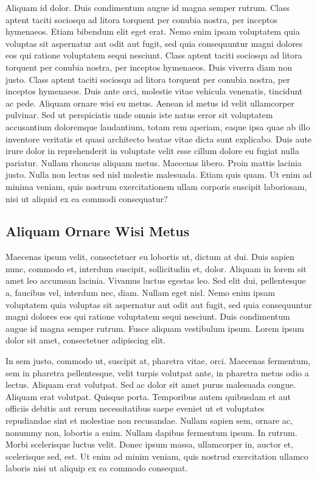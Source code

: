 \documentclass[english,master,dept460,male,cpp,cpdeclaration]{diploma}
\begin{document}
Aliquam id dolor. Duis condimentum augue id magna semper rutrum. Class aptent taciti sociosqu ad litora torquent per conubia nostra, per inceptos hymenaeos. Etiam bibendum elit eget erat. Nemo enim ipsam voluptatem quia voluptas sit aspernatur aut odit aut fugit, sed quia consequuntur magni dolores eos qui ratione voluptatem sequi nesciunt. Class aptent taciti sociosqu ad litora torquent per conubia nostra, per inceptos hymenaeos. Duis viverra diam non justo. Class aptent taciti sociosqu ad litora torquent per conubia nostra, per inceptos hymenaeos. Duis ante orci, molestie vitae vehicula venenatis, tincidunt ac pede. Aliquam ornare wisi eu metus. Aenean id metus id velit ullamcorper pulvinar. Sed ut perspiciatis unde omnis iste natus error sit voluptatem accusantium doloremque laudantium, totam rem aperiam, eaque ipsa quae ab illo inventore veritatis et quasi architecto beatae vitae dicta sunt explicabo. Duis aute irure dolor in reprehenderit in voluptate velit esse cillum dolore eu fugiat nulla pariatur. Nullam rhoncus aliquam metus. Maecenas libero. Proin mattis lacinia justo. Nulla non lectus sed nisl molestie malesuada. Etiam quis quam. Ut enim ad minima veniam, quis nostrum exercitationem ullam corporis suscipit laboriosam, nisi ut aliquid ex ea commodi consequatur?

\subsection{Aliquam Ornare Wisi Metus}
Maecenas ipsum velit, consectetuer eu lobortis ut, dictum at dui. Duis sapien nunc, commodo et, interdum suscipit, sollicitudin et, dolor. Aliquam in lorem sit amet leo accumsan lacinia. Vivamus luctus egestas leo. Sed elit dui, pellentesque a, faucibus vel, interdum nec, diam. Nullam eget nisl. Nemo enim ipsam voluptatem quia voluptas sit aspernatur aut odit aut fugit, sed quia consequuntur magni dolores eos qui ratione voluptatem sequi nesciunt. Duis condimentum augue id magna semper rutrum. Fusce aliquam vestibulum ipsum. Lorem ipsum dolor sit amet, consectetuer adipiscing elit.

In sem justo, commodo ut, suscipit at, pharetra vitae, orci. Maecenas fermentum, sem in pharetra pellentesque, velit turpis volutpat ante, in pharetra metus odio a lectus. Aliquam erat volutpat. Sed ac dolor sit amet purus malesuada congue. Aliquam erat volutpat. Quisque porta. Temporibus autem quibusdam et aut officiis debitis aut rerum necessitatibus saepe eveniet ut et voluptates repudiandae sint et molestiae non recusandae. Nullam sapien sem, ornare ac, nonummy non, lobortis a enim. Nullam dapibus fermentum ipsum. In rutrum. Morbi scelerisque luctus velit. Donec ipsum massa, ullamcorper in, auctor et, scelerisque sed, est. Ut enim ad minim veniam, quis nostrud exercitation ullamco laboris nisi ut aliquip ex ea commodo consequat.
\end{document}
